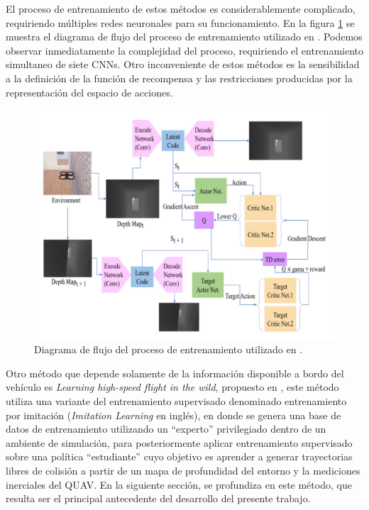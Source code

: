 El proceso de entrenamiento de estos métodos es considerablemente complicado, requiriendo múltiples redes neuronales para su funcionamiento. En la figura \ref{fig:prev-rl-training-process} se muestra el diagrama de flujo del proceso de entrenamiento utilizado en \cite{Xue2021}. Podemos observar inmediatamente la complejidad del proceso, requiriendo el entrenamiento simultaneo de siete CNNs. Otro inconveniente de estos métodos es la sensibilidad a la definición de la función de recompensa y las restricciones producidas por la representación del espacio de acciones.

\begin{figure}[H]
    \centering
    \includegraphics[scale=0.4]{partes/img/RL-training-process.png}
    \caption[Diagrama de flujo del proceso de entrenamiento utilizado en \textit{Vision Based Drone Obstacle Avoidance by Deep Reinforcement Learning}]{Diagrama de flujo del proceso de entrenamiento utilizado en \cite{Xue2021}.}
    \label{fig:prev-rl-training-process}
\end{figure}

Otro método que depende solamente de la información disponible a bordo del vehículo es \textit{Learning high-speed flight in the wild}, propuesto en \cite{Loquercio2021}, este método utiliza una variante del entrenamiento supervisado denominado entrenamiento por imitación (\textit{Imitation Learning} en inglés), en donde se genera una base de datos de entrenamiento utilizando un ``experto'' privilegiado dentro de un ambiente de simulación, para posteriormente aplicar entrenamiento supervisado sobre una política ``estudiante'' cuyo objetivo es aprender a generar trayectorias libres de colisión a partir de un mapa de profundidad del entorno y la mediciones inerciales del QUAV. En la siguiente sección, se profundiza en este método, que resulta ser el principal antecedente del desarrollo del presente trabajo.

